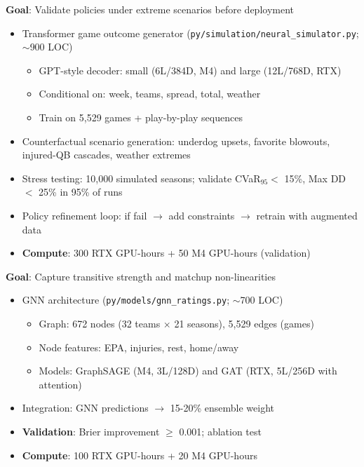 \textbf{Goal}: Validate policies under extreme scenarios before deployment

\begin{itemize}
  \item {} Transformer game outcome generator (\texttt{py/simulation/neural\_simulator.py}; $\sim$900 LOC)
  \begin{itemize}
    \item GPT-style decoder: small (6L/384D, M4) and large (12L/768D, RTX)
    \item Conditional on: week, teams, spread, total, weather
    \item Train on 5,529 games + play-by-play sequences
  \end{itemize}
  \item {} Counterfactual scenario generation: underdog upsets, favorite blowouts, injured-QB cascades, weather extremes
  \item {} Stress testing: 10,000 simulated seasons; validate CVaR$_{95} <$ 15\%, Max DD $<$ 25\% in 95\% of runs
  \item {} Policy refinement loop: if fail $\to$ add constraints $\to$ retrain with augmented data
  \item \textbf{Compute}: 300 RTX GPU-hours + 50 M4 GPU-hours (validation)
\end{itemize}

\textbf{Goal}: Capture transitive strength and matchup non-linearities

\begin{itemize}
  \item {} GNN architecture (\texttt{py/models/gnn\_ratings.py}; $\sim$700 LOC)
  \begin{itemize}
    \item Graph: 672 nodes (32 teams $\times$ 21 seasons), 5,529 edges (games)
    \item Node features: EPA, injuries, rest, home/away
    \item Models: GraphSAGE (M4, 3L/128D) and GAT (RTX, 5L/256D with attention)
  \end{itemize}
  \item {} Integration: GNN predictions $\to$ 15-20\% ensemble weight
  \item {} \textbf{Validation}: Brier improvement $\ge$ 0.001; ablation test
  \item \textbf{Compute}: 100 RTX GPU-hours + 20 M4 GPU-hours
\end{itemize}

